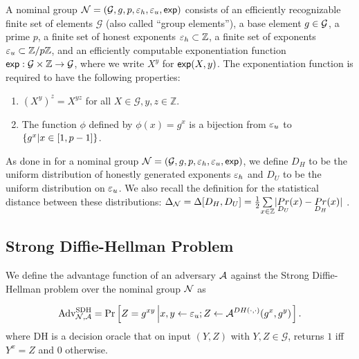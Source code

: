 \documentclass{article}
\begin{document}
    \begin{definition}
        A nominal group $\mathcal{N} =(\mathcal{G}, g, p, \varepsilon_h , \varepsilon_u , \textsf{exp})$ consists of an efficiently recognizable finite set of elements $\mathcal{G}$ (also called ``group elements''), a base element $g \in \mathcal{G}$, a prime $p$, a finite set of honest exponents $\varepsilon_h \subset \mathbb{Z}$, a finite set of exponents $\varepsilon_u \subset \mathbb{Z} / p\mathbb{Z}$, and an efficiently computable exponentiation function $\textsf{exp} : \mathcal{G} \times \mathbb{Z} \rightarrow \mathcal{G}$, where we write $X^y$ for $\textsf{exp}(X, y)$.
        The exponentiation function is required to have the following properties:

        \begin{enumerate}
        \item $(X^y)^z = X^{yz} $ for all $ X \in \mathcal{G}, y, z \in \mathbb{Z}$.
        \item The function $\phi$ defined by $\phi(x) = g^x$ is a bijection from $\varepsilon_u$ to $\{g^x | x \in [1, p - 1]\}$.
        \end{enumerate}
    \end{definition}

    As done in \cite{EC:ABHKLR21} for a nominal group $\mathcal{N} = (\mathcal{G}, g, p, \varepsilon_h , \varepsilon_u , \textsf{exp})$, we define $D_H$ to be the uniform distribution of honestly generated exponents $\varepsilon_h$ and $D_U$ to be the uniform distribution on $\varepsilon_u$.
    We also recall the definition for the statistical distance between these distributions: $\Delta_{\mathcal{N}} = \Delta [ D_H, D_U ] = \frac{1}{2} \underset{x \in \mathbb{Z}}{\sum} | \underset{D_U}{Pr}(x) - \underset{D_H}{Pr}(x) | $ \cite{EC:ABHKLR21}.

    \subsection{Strong Diffie-Hellman Problem}
    \label{sec:strong-dh}

    \begin{definition}
        We define the advantage function of an adversary $\mathcal{A}$ against the Strong Diffie-Hellman problem over the nominal group $\mathcal{N}$ as

        \[
            \text{Adv}_{\mathcal{N}, \mathcal{A}}^{\text{SDH}} = \Pr \left [Z = g^{xy} \left | x,y \leftarrow \varepsilon_u; Z \leftarrow \mathcal{A}^{DH(\cdot, \cdot)}(g^x, g^y) \right. \right].
        \]
        where DH is a decision oracle that on input $(Y, Z)$ with $Y, Z \in \mathcal{G}$, returns $1$ iff $Y^x = Z$ and $0$ otherwise.
    \end{definition}
\end{document}
